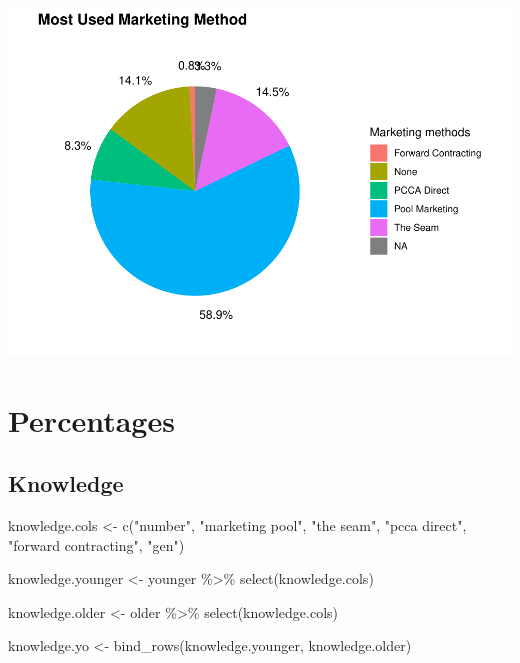 \documentclass[
]{article}
\newenvironment{Shaded}{\begin{snugshade}}{\end{snugshade}}
\newcommand{\FunctionTok}[1]{\textcolor[rgb]{0.00,0.00,0.00}{#1}}
\newcommand{\NormalTok}[1]{#1}
\newcommand{\OtherTok}[1]{\textcolor[rgb]{0.56,0.35,0.01}{#1}}
\newcommand{\SpecialCharTok}[1]{\textcolor[rgb]{0.00,0.00,0.00}{#1}}
\newcommand{\StringTok}[1]{\textcolor[rgb]{0.31,0.60,0.02}{#1}}
\begin{document}
\includegraphics{pcca_survey_files/figure-latex/marketing-old-1.pdf}

\hypertarget{percentages}{%
\section{Percentages}\label{percentages}}

\hypertarget{knowledge}{%
\subsection{Knowledge}\label{knowledge}}

\begin{Shaded}
\begin{Highlighting}[]
\NormalTok{knowledge.cols }\OtherTok{\textless{}{-}} \FunctionTok{c}\NormalTok{(}\StringTok{"number"}\NormalTok{, }\StringTok{"marketing pool"}\NormalTok{, }\StringTok{"the seam"}\NormalTok{, }\StringTok{"pcca direct"}\NormalTok{,}
    \StringTok{"forward contracting"}\NormalTok{, }\StringTok{"gen"}\NormalTok{)}

\NormalTok{knowledge.younger }\OtherTok{\textless{}{-}}\NormalTok{ younger }\SpecialCharTok{\%\textgreater{}\%}
    \FunctionTok{select}\NormalTok{(knowledge.cols)}

\NormalTok{knowledge.older }\OtherTok{\textless{}{-}}\NormalTok{ older }\SpecialCharTok{\%\textgreater{}\%}
    \FunctionTok{select}\NormalTok{(knowledge.cols)}
\end{Highlighting}
\end{Shaded}

\begin{Shaded}
\begin{Highlighting}[]
\NormalTok{knowledge.yo }\OtherTok{\textless{}{-}} \FunctionTok{bind\_rows}\NormalTok{(knowledge.younger, knowledge.older)}
\end{Highlighting}
\end{Shaded}
\end{document}
